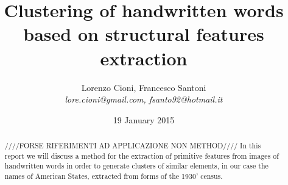 \documentclass[a4paper,12pt]{article}
\title{\bf Clustering of handwritten words based on structural features extraction}
\date {19 January 2015}
\author{Lorenzo Cioni, Francesco Santoni\\\textit{{\small lore.cioni@gmail.com, fsanto92@hotmail.it}}}
\begin{document}
\maketitle

\begin{abstract}
////FORSE RIFERIMENTI AD APPLICAZIONE NON METHOD////
In this report we will discuss a method for the extraction of primitive features from images of handwritten words in order to generate clusters of similar elements, in our case the names of American States, extracted from forms of the 1930' census.
\end{abstract}

\tableofcontents










\end{document}
